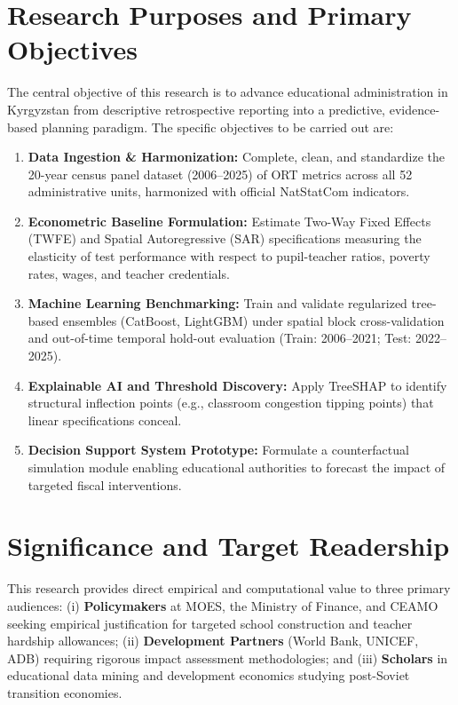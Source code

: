 \documentclass[12pt,letterpaper]{report}
\begin{document}
\section{Research Purposes and Primary Objectives}
The central objective of this research is to advance educational administration in Kyrgyzstan from descriptive retrospective reporting into a predictive, evidence-based planning paradigm. The specific objectives to be carried out are:
\begin{enumerate}[noitemsep,topsep=2pt,parsep=0pt]
    \item \textbf{Data Ingestion \& Harmonization:} Complete, clean, and standardize the 20-year census panel dataset (2006--2025) of ORT metrics across all 52 administrative units, harmonized with official NatStatCom indicators.
    \item \textbf{Econometric Baseline Formulation:} Estimate Two-Way Fixed Effects (TWFE) and Spatial Autoregressive (SAR) specifications measuring the elasticity of test performance with respect to pupil-teacher ratios, poverty rates, wages, and teacher credentials.
    \item \textbf{Machine Learning Benchmarking:} Train and validate regularized tree-based ensembles (CatBoost, LightGBM) under spatial block cross-validation and out-of-time temporal hold-out evaluation (Train: 2006--2021; Test: 2022--2025).
    \item \textbf{Explainable AI and Threshold Discovery:} Apply TreeSHAP to identify structural inflection points (e.g., classroom congestion tipping points) that linear specifications conceal.
    \item \textbf{Decision Support System Prototype:} Formulate a counterfactual simulation module enabling educational authorities to forecast the impact of targeted fiscal interventions.
\end{enumerate}

\section{Significance and Target Readership}
This research provides direct empirical and computational value to three primary audiences: (i) \textbf{Policymakers} at MOES, the Ministry of Finance, and CEAMO seeking empirical justification for targeted school construction and teacher hardship allowances; (ii) \textbf{Development Partners} (World Bank, UNICEF, ADB) requiring rigorous impact assessment methodologies; and (iii) \textbf{Scholars} in educational data mining and development economics studying post-Soviet transition economies.
\end{document}
